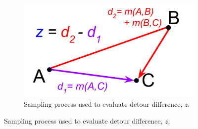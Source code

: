 \begin{figure}[!htbp]
\begin{center}

\begin{minipage}{\linewidth}
\begin{subfigure}[b]{\linewidth}
\begin{minipage}{0.5\textwidth}
\begin{center}
\includegraphics[width=\linewidth]{img/detour-difference}
\end{center}
\end{minipage}%
\begin{minipage}{0.5\textwidth}
\caption{
Sampling process used to evaluate detour difference, $z$.
} \label{fig:detour_difference_cartoon}
\end{minipage}
\end{subfigure}
\end{minipage}


\end{center}
\end{figure}
